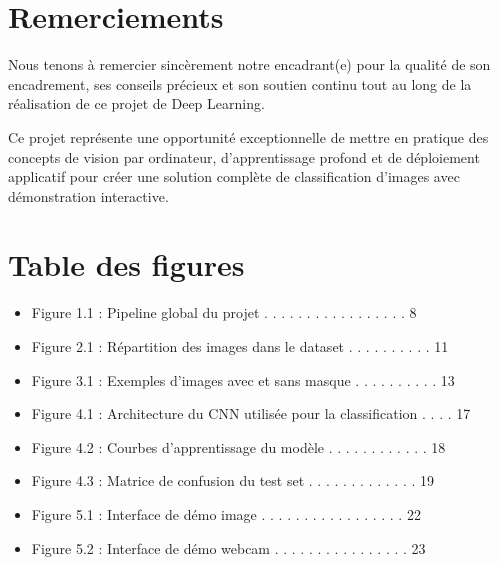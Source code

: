 \documentclass[11pt,a4paper]{article}
\begin{document}
\vfill

\newpage
\section*{Remerciements}

Nous tenons à remercier sincèrement notre encadrant(e) pour la qualité de son encadrement, ses conseils précieux et son soutien continu tout au long de la réalisation de ce projet de Deep Learning.

Ce projet représente une opportunité exceptionnelle de mettre en pratique des concepts de vision par ordinateur, d'apprentissage profond et de déploiement applicatif pour créer une solution complète de classification d'images avec démonstration interactive.

\newpage
\tableofcontents

\newpage
\section*{Table des figures}

\begin{itemize}
    \item Figure 1.1 : Pipeline global du projet . . . . . . . . . . . . . . . . . 8
    \item Figure 2.1 : Répartition des images dans le dataset . . . . . . . . . . 11
    \item Figure 3.1 : Exemples d'images avec et sans masque . . . . . . . . . . 13
    \item Figure 4.1 : Architecture du CNN utilisée pour la classification . . . . 17
    \item Figure 4.2 : Courbes d'apprentissage du modèle . . . . . . . . . . . . 18
    \item Figure 4.3 : Matrice de confusion du test set . . . . . . . . . . . . . 19
    \item Figure 5.1 : Interface de démo image . . . . . . . . . . . . . . . . . 22
    \item Figure 5.2 : Interface de démo webcam . . . . . . . . . . . . . . . . 23
\end{itemize}
\end{document}
